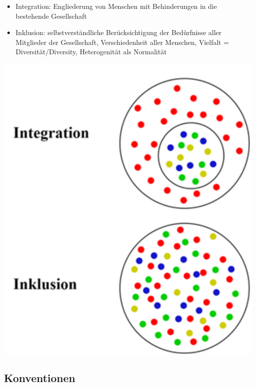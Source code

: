 \documentclass[paper=a4, fontsize=11pt]{scrartcl} %
\numberwithin{equation}{section} %
\numberwithin{figure}{section} %
\numberwithin{table}{section} %
\begin{document}
\begin{minipage}[c]{0.55\textwidth}
\begin{itemize}
\item Integration: Engliederung von Menschen mit Behinderungen in die bestehende Gesellschaft
\item Inklusion: selbstverständliche Berücksichtigung der Bedürfnisse aller Mitglieder der Gesellschaft, Verschiedenheit aller Menschen, Vielfalt = Diversität/Diversity, Heterogenität als Normalität
\end{itemize}
\end{minipage}
\begin{minipage}[c]{0.35\textwidth}
\includegraphics[width=\textwidth]{imgs/inklusion}
\end{minipage}

\subsection{Konventionen}
\end{document}
